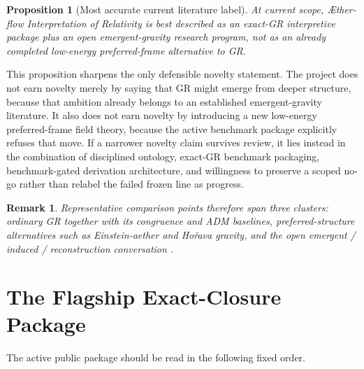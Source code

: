 \documentclass[11pt]{article}
\newcommand{\Aflow}{\AE{}ther-flow}
\newcommand{\TheoryName}{\Aflow{} Interpretation of Relativity}
\newtheorem{proposition}{Proposition}
\newtheorem{remark}{Remark}
\begin{document}
\begin{proposition}[Most accurate current literature label]
At current scope, \TheoryName{} is best described as an exact-GR interpretive package plus an open emergent-gravity research program, not as an already completed low-energy preferred-frame alternative to GR.
\end{proposition}

This proposition sharpens the only defensible novelty statement. The project does not earn novelty merely by saying that GR might emerge from deeper structure, because that ambition already belongs to an established emergent-gravity literature. It also does not earn novelty by introducing a new low-energy preferred-frame field theory, because the active benchmark package explicitly refuses that move. If a narrower novelty claim survives review, it lies instead in the combination of disciplined ontology, exact-GR benchmark packaging, benchmark-gated derivation architecture, and willingness to preserve a scoped no-go rather than relabel the failed frozen line as progress.

\begin{remark}
Representative comparison points therefore span three clusters: ordinary GR together with its congruence and ADM baselines, preferred-structure alternatives such as Einstein-aether and Ho\v{r}ava gravity, and the open emergent / induced / reconstruction conversation \cite{Einstein1916,Raychaudhuri1955,EllisVanElst1999,ADM1962,JacobsonMattingly2001,JacobsonMattingly2004,ElingJacobson2004,Jacobson2010,Jacobson2014,JacobsonSperanza2015,Horava2009,Jacobson1995,Visser2002,HojmanKucharTeitelboim1976,Deser2004,Lovelock1971,BarceloLiberatiVisser2011,Sakharov1967}.
\end{remark}

\section{The Flagship Exact-Closure Package}

The active public package should be read in the following fixed order.
\end{document}
